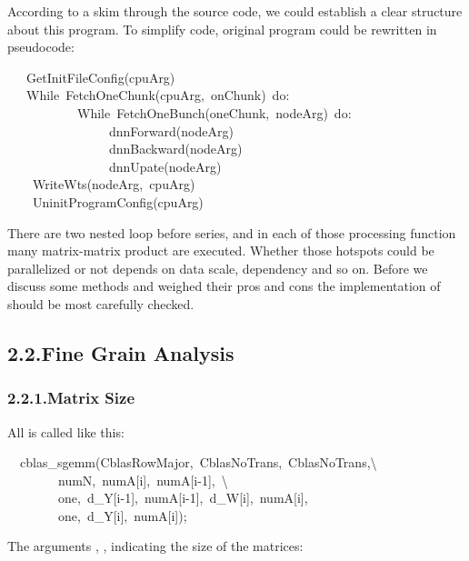 \documentclass{article}
\begin{document}
According to a skim through the source code, we could establish a clear structure about this program. To simplify code, original program could be rewritten in pseudocode:%
\begin{mdpre}%
\noindent~~~{GetInitFileConfig}(cpuArg)\\
~~~{While}~{FetchOneChunk}(cpuArg,~onChunk)~{do}:\\
~~~~~~~~~~~{While}~{FetchOneBunch}(oneChunk,~nodeArg)~{do}:\\
~~~~~~~~~~~~~~~~dnnForward(nodeArg)\\
~~~~~~~~~~~~~~~~dnnBackward(nodeArg)\\
~~~~~~~~~~~~~~~~dnnUpate(nodeArg)\\
~~~~{WriteWts}(nodeArg,~cpuArg)\\
~~~~{UninitProgramConfig}(cpuArg)\\
\end{mdpre}\noindent{}There are two nested loop before  series, and 
in each of those processing function many matrix-matrix product are
executed. Whether those hotspots could be parallelized or not depends
on data scale, dependency and so on. Before we discuss some methods and weighed their pros and cons the implementation of  should be most carefully checked.

\subsection{2.2.\hspace*{0.5em}Fine Grain Analysis}\label{sec-fine-grain-analysis}%

\subsubsection{2.2.1.\hspace*{0.5em}Matrix Size}\label{sec-matrix-size}%

\noindent{}All  is called like this:%
\begin{mdpre}%
\noindent~~cblas\_sgemm({CblasRowMajor},~{CblasNoTrans},~{CblasNoTrans},\textbackslash{}\\
~~~~~~~~numN,~numA[i],~numA[i-{1}],~\textbackslash{}\\
~~~~~~~~one,~d\_Y[i-{1}],~numA[i-{1}],~d\_W[i],~numA[i],\\
~~~~~~~~one,~d\_Y[i],~numA[i]);%
\end{mdpre}\noindent{}The arguments , ,  indicating the size of the matrices:
\end{document}
